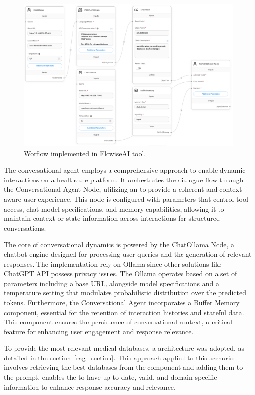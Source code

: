\begin{figure}[ht]
    \includegraphics[width=\textwidth]{figs/chapter3/workflow.png}
    \centering
    \caption[Worflow implemented in FlowiseAI tool]{Worflow implemented in FlowiseAI tool.}
    \label{fig_workflow}
\end{figure}


The conversational agent employs a comprehensive approach to enable dynamic interactions on a healthcare {\ir} platform. It orchestrates the dialogue flow through the Conversational Agent Node, utilizing an {\llm} to provide a coherent and context-aware user experience. This node is configured with parameters that control tool access, chat model specifications, and memory capabilities, allowing it to maintain context or state information across interactions for structured conversations.

The core of conversational dynamics is powered by the ChatOllama Node, a chatbot engine designed for processing user queries and the generation of relevant responses. The implementation rely on Ollama since other solutions like ChatGPT API possess privacy issues. The Ollama operates based on a set of parameters including a base URL, alongside model specifications and a temperature setting that modulates probabilistic distribution over the predicted tokens. Furthermore, the Conversational Agent incorporates a Buffer Memory component, essential for the retention of interaction histories and stateful data. This component ensures the persistence of conversational context, a critical feature for enhancing user engagement and response relevance.

To provide the most relevant medical databases, a {\rag} architecture was adopted, as detailed in the section~\ref{rag_section}. This approach applied to this scenario involves retrieving the best databases from the {\ir} component and adding them to the {\llm} prompt. {\rag} enables the {\llm} to have up-to-date, valid, and domain-specific information to enhance response accuracy and relevance. 

